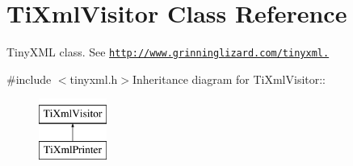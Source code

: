 \hypertarget{class_ti_xml_visitor}{
\section{TiXmlVisitor Class Reference}
\label{class_ti_xml_visitor}
}


TinyXML class. See \href{http://www.grinninglizard.com/tinyxml.}{\tt http://www.grinninglizard.com/tinyxml.}  


{\ttfamily \#include $<$tinyxml.h$>$}Inheritance diagram for TiXmlVisitor::\begin{figure}[H]
\begin{center}
\leavevmode
\includegraphics[height=2cm]{class_ti_xml_visitor}
\end{center}
\end{figure}
